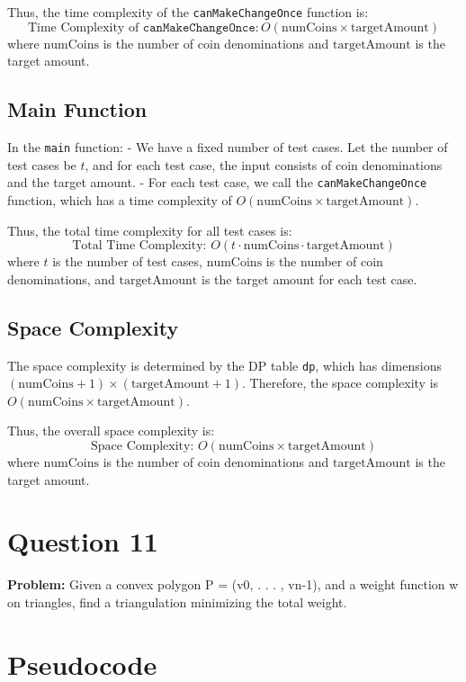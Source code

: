 \documentclass[a4paper,12pt]{report}
\begin{document}
Thus, the time complexity of the \texttt{canMakeChangeOnce} function is:
\[
\text{Time Complexity of } \texttt{canMakeChangeOnce}: O(\text{numCoins} \times \text{targetAmount})
\]
where \(\text{numCoins}\) is the number of coin denominations and \(\text{targetAmount}\) is the target amount.

\subsection*{Main Function}

In the \texttt{main} function:
- We have a fixed number of test cases. Let the number of test cases be \(t\), and for each test case, the input consists of coin denominations and the target amount.
- For each test case, we call the \texttt{canMakeChangeOnce} function, which has a time complexity of \(O(\text{numCoins} \times \text{targetAmount})\).

Thus, the total time complexity for all test cases is:
\[
\text{Total Time Complexity: } O(t \cdot \text{numCoins} \cdot \text{targetAmount})
\]
where \(t\) is the number of test cases, \(\text{numCoins}\) is the number of coin denominations, and \(\text{targetAmount}\) is the target amount for each test case.

\subsection*{Space Complexity}

The space complexity is determined by the DP table \texttt{dp}, which has dimensions \((\text{numCoins} + 1) \times (\text{targetAmount} + 1)\). Therefore, the space complexity is \(O(\text{numCoins} \times \text{targetAmount})\).

Thus, the overall space complexity is:
\[
\text{Space Complexity: } O(\text{numCoins} \times \text{targetAmount})
\]
where \(\text{numCoins}\) is the number of coin denominations and \(\text{targetAmount}\) is the target amount.

\newpage
\section*{Question 11}

\textbf{Problem:}
Given a convex polygon P = (v0, . . . , vn-1), and a weight function w on triangles, find a triangulation minimizing the total weight.

\section*{Pseudocode}
\end{document}
